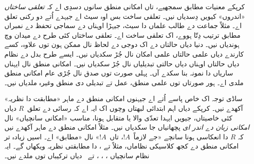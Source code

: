 \documentclass[../../../include/open-logic-section]{subfiles}
\begin{document}
کرپکے معنیات مطابق سمجھیے، تاں امکانی منطق سانوں دسدِی
اے کہ \emph{تعلقی ساختاں} «اندروں» کیویں دِسدیاں نیں۔
تعلقی ساخت بس اوہ سیٹ اے جیہدے اُتے دو رکنی تعلق اے۔
مثلاً جماعت دے طالب علماں دا سیٹ، جیہڑا اوہناں دے سماجی
تحفظ دے نمبراں مطابق ترتیب دِتّا ہووے، اک تعلقی ساخت اے۔
تعلقی ساختاں کئی طرح دے میدان وچ ہوندیاں نیں۔ دنیا دیاں
حالتاں دے اک دوجی دے لحاظ نال ممکن ہون توں علاوہ، کسے
کارندے دیاں علمی حالتاں علمی امکان نال جُڑ سکدیاں نیں۔
ایسے طرح بدل دے نظام دیاں حالتاں اوہناں دیاں حالتی
تبدیلیاں نال جُڑ سکدیاں نیں۔ امکانی منطق نال ایہناں
ساریاں دا نمونہ بنا سکدے آں۔ پہلی صورت توں صدق نال جُڑی
عام امکانی منطق ملدی اے۔ ہور صورتاں توں علمی منطق، عمل تے
تبدیلی دی منطق وغیرہ ملدیاں نیں۔

ساڈی توجہ اک خاص پاسے اُتے اے جیہنوں امکانی منطق دے
ماہر «مطابقت دا نظریہ» آکھدے نیں۔ کرپکے دیاں اہم ابتدائی
لبھتاں وچوں اک ایہ اے کہ رسائی دے تعلق~$R$ دیاں کئی
خاصیتاں، جیویں ایہدا تعدّی والا یا متقابل ہونا، مناسب
«امکانی سانچیاں» نال \emph{امکانی زبان دے اندر ای} پچھانیاں
جا سکدیاں نیں۔ مثلاً امکانی منطق دے ماہر آکھدے نیں کہ
$R$ دا انعکاسی ہونا سانچے «جے لازماً~$!A$، تاں~$!A$»
نال «مطابق» اے۔ اسیں زیادہ تر امکانی منطق دے کجھ کلاسیکی
نظاماں، مثلاً  تے ، دا مطابقتی نظریہ
ویکھاں گے۔ ایہ نظام سانچیاں ، ، ،
 تے~ دیاں ترکیباں توں ملدے نیں۔
\end{document}
